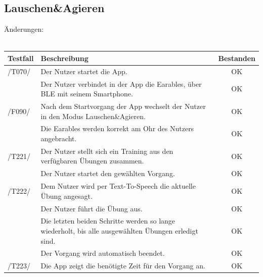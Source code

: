\documentclass[a4paper,12pt]{article}
\newcommand{\testok}[0]{
	\cellcolor{green!25} OK
}
\begin{document}
\subsection{Lauschen\&Agieren}
Änderungen:
\\
\\
\begin{tabular}{ |p{1.5cm} | p{12cm} | c| }
	\hline
	\textbf{Testfall} & \textbf{Beschreibung} & \textbf{Bestanden}\\
	\hline
	/T070/ & Der Nutzer startet die App. & \testok \\
	\hline
	& Der Nutzer verbindet in der App die Earables, über BLE mit seinem Smartphone. & \testok  \\
	\hline
	/F090/ & Nach dem Startvorgang der App wechselt der Nutzer in den Modus \glqq Lauschen\&Agieren\grqq . & \testok  \\
	\hline
	& Die Earables werden korrekt am Ohr des Nutzers angebracht. & \testok  \\
	\hline
	/T221/ & Der Nutzer stellt sich ein Training aus den verfügbaren Übungen zusammen. & \testok  \\
	\hline
	& Der Nutzer startet den gewählten Vorgang. & \testok  \\
	\hline
	/T222/ & Dem Nutzer wird per Text-To-Speech die aktuelle Übung angesagt. & \testok  \\
	\hline
	& Der Nutzer führt die Übung aus. & \testok  \\
	\hline
	& Die letzten beiden Schritte werden so lange wiederholt, bis alle ausgewählten Übungen erledigt sind. & \testok  \\
	\hline
	& Der Vorgang wird automatisch beendet. & \testok  \\
	\hline
	/T223/ & Die App zeigt die benötigte Zeit für den Vorgang an. & \testok  \\
	\hline
\end{tabular}
\end{document}
